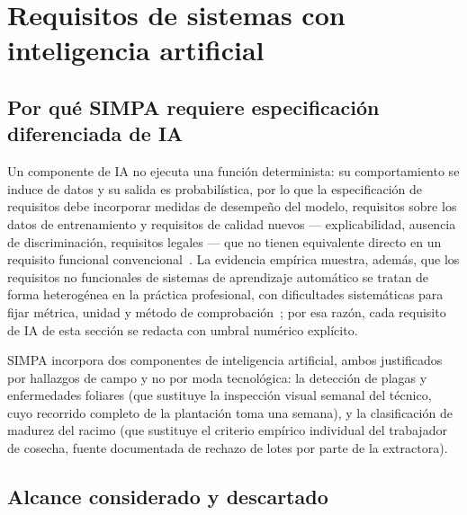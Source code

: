 \documentclass[11pt,a4paper]{article}
\begin{document}
\section{Requisitos de sistemas con inteligencia artificial}
\label{sec:ia}

\subsection{Por qué SIMPA requiere especificación diferenciada de IA}

Un componente de IA no ejecuta una función determinista: su comportamiento se induce de datos y su
salida es probabilística, por lo que la especificación de requisitos debe incorporar medidas de
desempeño del modelo, requisitos sobre los datos de entrenamiento y requisitos de calidad nuevos
--- explicabilidad, ausencia de discriminación, requisitos legales --- que no tienen equivalente
directo en un requisito funcional convencional~\cite{ahmad2023}. La evidencia empírica muestra,
además, que los requisitos no funcionales de sistemas de aprendizaje automático se tratan de forma
heterogénea en la práctica profesional, con dificultades sistemáticas para fijar métrica, unidad y
método de comprobación~\cite{habibullah2023}; por esa razón, cada requisito de IA de esta sección
se redacta con umbral numérico explícito.

SIMPA incorpora dos componentes de inteligencia artificial, ambos justificados por hallazgos de
campo y no por moda tecnológica: la detección de plagas y enfermedades foliares (que sustituye la
inspección visual semanal del técnico, cuyo recorrido completo de la plantación toma una semana), y
la clasificación de madurez del racimo (que sustituye el criterio empírico individual del
trabajador de cosecha, fuente documentada de rechazo de lotes por parte de la extractora).

\subsection{Alcance considerado y descartado}
\end{document}

